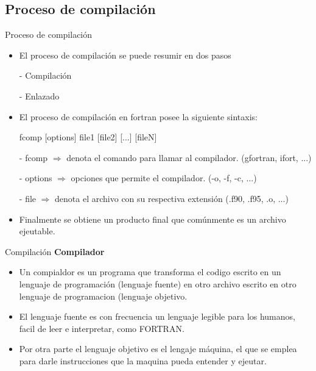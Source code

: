 
\subsection{Proceso de compilación}

\begin{frame}[fragile]{Proceso de compilación}
  \begin{itemize}[<+(1)->]
  \item  El proceso de compilación se puede resumir en dos pasos
  \hspace{1cm} \item [-] Compilación
  \hspace{1cm} \item [-] Enlazado

  \item El proceso de compilación en fortran posee la siguiente sintaxis:
   \begin{mintedbash}
    fcomp [options] file1 [file2] [...] [fileN]
   \end{mintedbash}
  \item [-] fcomp $\Rightarrow$ denota el comando para llamar al compilador. (gfortran, ifort, ...)
  \item [-] options $\Rightarrow$ opciones que permite el compilador. (-o, -f, -c, ...)
  \item [-] file $\Rightarrow$ denota el archivo con su respectiva extensión (.f90, .f95, .o, ...)
  \item Finalmente se obtiene un producto final que comúnmente es un archivo ejeutable.
\end{itemize}
\end{frame}


\begin{frame}[fragile]{Compilación}
\textbf{Compilador}
  \begin{itemize}[<+(1)->]
  \item Un compialdor es un programa que transforma el codigo escrito
  en un lenguaje de programación (lenguaje fuente) en otro archivo escrito
  en otro lenguaje de programacion (lenguaje objetivo.

  \item El lenguaje fuente es con frecuencia un lenguaje legible para los
  humanos, facil de leer e interpretar, como FORTRAN.

  \item Por otra parte el lenguaje objetivo es el lengaje máquina, el que
  se emplea para darle instrucciones que la maquina pueda entender y
  ejeutar.
 \end{itemize}
\end{frame}


